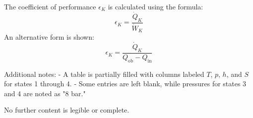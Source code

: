 The coefficient of performance \( \epsilon_K \) is calculated using the formula:  
\[
\epsilon_K = \frac{\dot{Q}_K}{\dot{W}_K}
\]  
An alternative form is shown:  
\[
\epsilon_K = \frac{\dot{Q}_K}{Q_{\text{ob}} - Q_{\text{in}}}
\]  

Additional notes:  
- A table is partially filled with columns labeled \( T \), \( p \), \( h \), and \( S \) for states 1 through 4.  
- Some entries are left blank, while pressures for states 3 and 4 are noted as "8 bar."  

No further content is legible or complete.